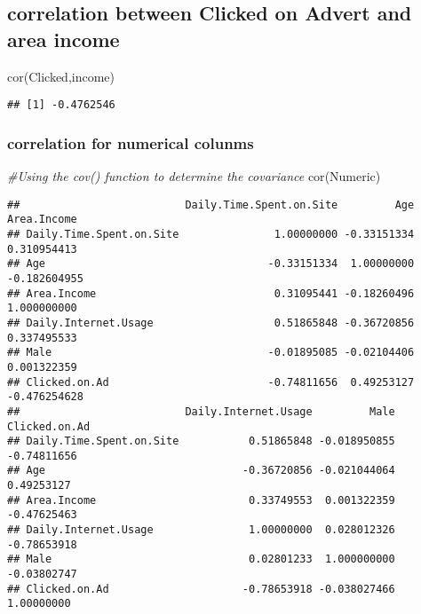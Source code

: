 \documentclass[
]{article}
\newenvironment{Shaded}{\begin{snugshade}}{\end{snugshade}}
\newcommand{\CommentTok}[1]{\textcolor[rgb]{0.56,0.35,0.01}{\textit{#1}}}
\newcommand{\FunctionTok}[1]{\textcolor[rgb]{0.00,0.00,0.00}{#1}}
\newcommand{\NormalTok}[1]{#1}
\begin{document}
\hypertarget{correlation-between-clicked-on-advert-and-area-income}{%
\subsection{correlation between Clicked on Advert and area
income}\label{correlation-between-clicked-on-advert-and-area-income}}

\begin{Shaded}
\begin{Highlighting}[]
\FunctionTok{cor}\NormalTok{(Clicked,income)}
\end{Highlighting}
\end{Shaded}

\begin{verbatim}
## [1] -0.4762546
\end{verbatim}

\hypertarget{correlation-for-numerical-colunms}{%
\subsubsection{correlation for numerical
colunms}\label{correlation-for-numerical-colunms}}

\begin{Shaded}
\begin{Highlighting}[]
\CommentTok{\#Using the cov() function to determine the covariance}
\FunctionTok{cor}\NormalTok{(Numeric)}
\end{Highlighting}
\end{Shaded}

\begin{verbatim}
##                          Daily.Time.Spent.on.Site         Age  Area.Income
## Daily.Time.Spent.on.Site               1.00000000 -0.33151334  0.310954413
## Age                                   -0.33151334  1.00000000 -0.182604955
## Area.Income                            0.31095441 -0.18260496  1.000000000
## Daily.Internet.Usage                   0.51865848 -0.36720856  0.337495533
## Male                                  -0.01895085 -0.02104406  0.001322359
## Clicked.on.Ad                         -0.74811656  0.49253127 -0.476254628
##                          Daily.Internet.Usage         Male Clicked.on.Ad
## Daily.Time.Spent.on.Site           0.51865848 -0.018950855   -0.74811656
## Age                               -0.36720856 -0.021044064    0.49253127
## Area.Income                        0.33749553  0.001322359   -0.47625463
## Daily.Internet.Usage               1.00000000  0.028012326   -0.78653918
## Male                               0.02801233  1.000000000   -0.03802747
## Clicked.on.Ad                     -0.78653918 -0.038027466    1.00000000
\end{verbatim}
\end{document}
